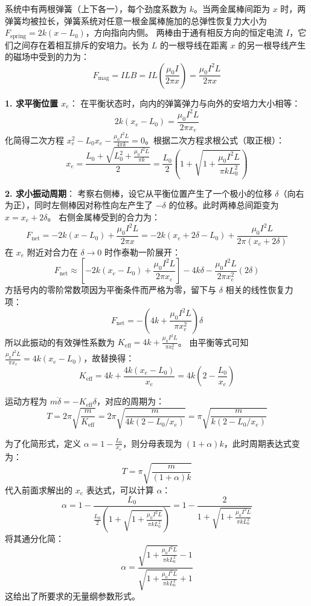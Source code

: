 \begin{solution}
系统中有两根弹簧（上下各一），每个劲度系数为 $k$。当两金属棒间距为 $x$ 时，两弹簧均被拉长，弹簧系统对任意一根金属棒施加的总弹性恢复力大小为 $F_{\text{spring}} = 2k(x - L_0)$，方向指向内侧。
两棒由于通有相反方向的恒定电流 $I$，它们之间存在着相互排斥的安培力。长为 $L$ 的一根导线在距离 $x$ 的另一根导线产生的磁场中受到的力为：
$$ F_{\text{mag}} = I L B = I L \left( \frac{\mu_0 I}{2\pi x} \right) = \frac{\mu_0 I^2 L}{2\pi x} $$

\textbf{1. 求平衡位置 $x_e$}：
在平衡状态时，向内的弹簧弹力与向外的安培力大小相等：
$$ 2k(x_e - L_0) = \frac{\mu_0 I^2 L}{2\pi x_e} $$
化简得二次方程 $x_e^2 - L_0 x_e - \frac{\mu_0 I^2 L}{4\pi k} = 0$。根据二次方程求根公式（取正根）：
$$ x_e = \frac{L_0 + \sqrt{L_0^2 + \frac{\mu_0 I^2 L}{\pi k}}}{2} = \frac{L_0}{2} \left( 1 + \sqrt{1 + \frac{\mu_0 I^2 L}{\pi k L_0^2}} \right) $$

\textbf{2. 求小振动周期}：
考察右侧棒，设它从平衡位置产生了一个极小的位移 $\delta$（向右为正），同时左侧棒因对称性向左产生了 $-\delta$ 的位移。此时两棒总间距变为 $x = x_e + 2\delta$。
右侧金属棒受到的合力为：
$$ F_{\text{net}} = -2k (x - L_0) + \frac{\mu_0 I^2 L}{2\pi x} = -2k (x_e + 2\delta - L_0) + \frac{\mu_0 I^2 L}{2\pi (x_e + 2\delta)} $$
在 $x_e$ 附近对合力在 $\delta \to 0$ 时作泰勒一阶展开：
$$ F_{\text{net}} \approx \left[ -2k (x_e - L_0) + \frac{\mu_0 I^2 L}{2\pi x_e} \right] - 4k \delta - \frac{\mu_0 I^2 L}{2\pi x_e^2} (2\delta) $$
方括号内的零阶常数项因为平衡条件而严格为零，留下与 $\delta$ 相关的线性恢复力项：
$$ F_{\text{net}} = - \left( 4k + \frac{\mu_0 I^2 L}{\pi x_e^2} \right) \delta $$
所以此振动的有效弹性系数为 $K_{\text{eff}} = 4k + \frac{\mu_0 I^2 L}{\pi x_e^2}$。
由平衡等式可知 $\frac{\mu_0 I^2 L}{\pi x_e} = 4k(x_e - L_0)$，故替换得：
$$ K_{\text{eff}} = 4k + \frac{4k(x_e - L_0)}{x_e} = 4k \left( 2 - \frac{L_0}{x_e} \right) $$

运动方程为 $m \ddot{\delta} = - K_{\text{eff}} \delta$，对应的周期为：
$$ T = 2\pi \sqrt{\frac{m}{K_{\text{eff}}}} = 2\pi \sqrt{\frac{m}{4k (2 - L_0/x_e)}} = \pi \sqrt{\frac{m}{k (2 - L_0/x_e)}} $$

为了化简形式，定义 $\alpha = 1 - \frac{L_0}{x_e}$，则分母表现为 $(1+\alpha)k$，此时周期表达式变为：
$$ T = \pi \sqrt{\frac{m}{(1+\alpha)k}} $$
代入前面求解出的 $x_e$ 表达式，可以计算 $\alpha$：
$$ \alpha = 1 - \frac{L_0}{\frac{L_0}{2} \left( 1 + \sqrt{1 + \frac{\mu_0 I^2 L}{\pi k L_0^2}} \right)} = 1 - \frac{2}{1 + \sqrt{1 + \frac{\mu_0 I^2 L}{\pi k L_0^2}}} $$
将其通分化简：
$$ \alpha = \frac{\sqrt{1 + \frac{\mu_0 I^2 L}{\pi k L_0^2}} - 1}{\sqrt{1 + \frac{\mu_0 I^2 L}{\pi k L_0^2}} + 1} $$
这给出了所要求的无量纲参数形式。
\end{solution}

